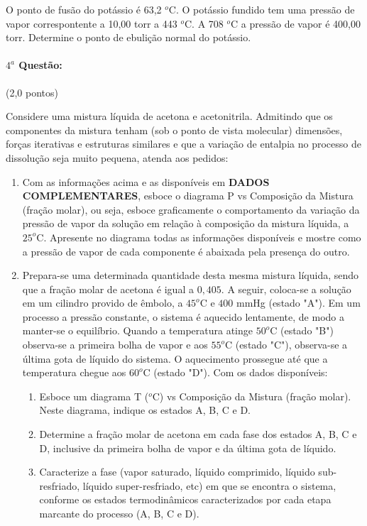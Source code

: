 \documentclass[12pt,a4paper]{article}
\begin{document}
O ponto de fusão do potássio é 63,2 $^o$C. O potássio fundido tem uma pressão de vapor correspontente a 10,00 torr a 443 $^o$C. A 708 $^o$C a pressão de vapor é 400,00 torr. Determine o ponto de ebulição normal do potássio.


\paragraph{$4^a$ Questão:} (2,0 pontos)

Considere uma mistura líquida de acetona e acetonitrila. Admitindo que os componentes da mistura tenham (sob o ponto de vista molecular)
dimensões, forças iterativas e estruturas similares e que a variação de entalpia no processo de dissolução seja muito pequena,
atenda aos pedidos:

\begin{enumerate}[label=\roman*.]
\item Com as informações acima e as disponíveis em \textbf{DADOS COMPLEMENTARES}, esboce o diagrama P vs Composição da Mistura (fração molar),
ou seja, esboce graficamente o comportamento da variação da pressão de vapor da solução em relação à composição da mistura líquida, a $25^o$C.
Apresente no diagrama todas as informações disponíveis e mostre como a pressão de vapor de cada componente é abaixada pela presença do outro.
\item Prepara-se uma determinada quantidade desta mesma mistura líquida, sendo que a fração molar de acetona é igual a $0,405$. A seguir, coloca-se
a solução em um cilindro provido de êmbolo, a $45^o$C e $400$ mmHg (estado "A"). Em um processo a pressão constante, o sistema é aquecido lentamente, de modo
a manter-se o equilíbrio. Quando a temperatura atinge $50^o$C (estado "B") observa-se a primeira bolha de vapor e aos $55^o$C (estado "C"), observa-se a última gota 
de líquido do sistema. O aquecimento prossegue até que a temperatura chegue aos $60^o$C (estado "D"). Com os dados disponíveis:
\begin{enumerate}
\item Esboce um diagrama T ($^o$C) vs Composição da Mistura (fração molar). Neste diagrama, indique os estados A, B, C e D.
\item Determine a fração molar de acetona em cada fase dos estados A, B, C e D, inclusive da primeira bolha de vapor e da última gota de líquido.
\item Caracterize a fase (vapor saturado, líquido comprimido, líquido sub-resfriado, líquido super-resfriado, etc) em que se encontra o sistema, conforme os estados termodinâmicos caracterizados por cada etapa marcante do processo (A, B, C e D).
\end{enumerate}
\end{enumerate}
\end{document}
